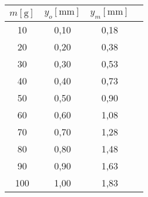 \begin{tabular}{cccc}                                                                   \toprule
$ m [\si{\gram}]$   &   $y_o [\si{\milli\metre}]$   &   $y_m [\si{\milli\metre}]$   \\  \midrule
10                  &   0,10                        &   0,18                        \\  
20                  &   0,20                        &   0,38                        \\  
30                  &   0,30                        &   0,53                        \\  
40                  &   0,40                        &   0,73                        \\  
50                  &   0,50                        &   0,90                        \\  
60                  &   0,60                        &   1,08                        \\  
70                  &   0,70                        &   1,28                        \\  
80                  &   0,80                        &   1,48                        \\  
90                  &   0,90                        &   1,63                        \\  
100                 &   1,00                        &   1,83                        \\  \bottomrule

\end{tabular}
